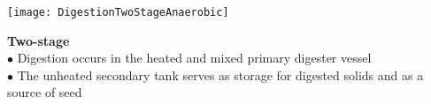 \vspace{1cm}

\begin{minipage}{.5\textwidth}

		\texttt{[image: DigestionTwoStageAnaerobic]}\\
    \end{minipage}
\begin{minipage}{.35\textwidth}\textbf{Two-stage}\\
$\bullet$ Digestion occurs in the heated and mixed primary digester vessel\\
$\bullet$ The unheated secondary tank serves as storage for digested solids and as a source of seed\\  \end{minipage}\\
\vspace{1cm}

\vspace{1cm}

